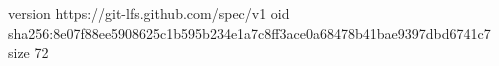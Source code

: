 version https://git-lfs.github.com/spec/v1
oid sha256:8e07f88ee5908625c1b595b234e1a7c8ff3ace0a68478b41bae9397dbd6741c7
size 72
